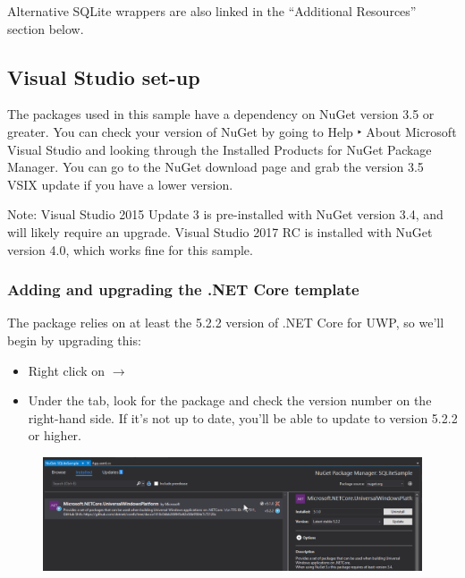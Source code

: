 Alternative SQLite wrappers are also linked in the “Additional Resources” section below.

\subsection{Visual Studio set-up}

The packages used in this sample have a dependency on NuGet version 3.5 or greater. You can check your version of NuGet by going to Help ‣ About Microsoft Visual Studio and looking through the Installed Products for NuGet Package Manager. You can go to the NuGet download page and grab the version 3.5 VSIX update if you have a lower version.

Note: Visual Studio 2015 Update 3 is pre-installed with NuGet version 3.4, and will likely require an upgrade. Visual Studio 2017 RC is installed with NuGet version 4.0, which works fine for this sample.

\subsubsection{Adding  and upgrading the .NET Core template}

The  package relies on at least the 5.2.2 version of .NET Core for UWP, so we’ll begin by upgrading this:

\begin{itemize}
	\item Right click on  $ \to $ 
	\item Under the  tab, look for the  package and check the version number on the right-hand side. If it’s not up to date, you’ll be able to update to version 5.2.2 or higher.
\end{itemize}

\begin{figure}
	\centering
	\includegraphics[width=\linewidth]{figures/sqlite_package_check}
	\caption{}
	\label{fig:sqlitepackagecheck}
\end{figure}

